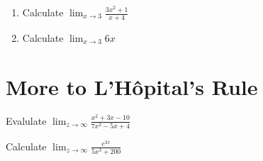 \documentclass[12pt]{article}
\newenvironment{problem}[2][Problem]{\begin{trivlist}
\item[\hskip \labelsep {\bfseries #1}\hskip \labelsep {\bfseries #2.}]}{\end{trivlist}}
\begin{document}
\renewcommand{\labelenumi}{(\alph{enumi})}
\begin{problem}4{}
\begin{enumerate}
    \item Calculate $\displaystyle{\lim_{x\to 3} \frac{3x^2+1}{x+4}}$
    \item Calculate  $\displaystyle{\lim_{x\to 3} 6x}$

 \end{enumerate}
 \end{problem}
 \pagebreak
 \section*{More to L'H\^opital's Rule}


\begin{problem}{1}
Evalulate $\displaystyle{\lim_{z\to \infty} \frac{x^2+3x-10}{7x^2-5x+4}}$
\end{problem}
\vspace{2in}
\begin{problem}{2}
Calculate
$\displaystyle{\lim_{z\to \infty} \frac{e^{3x}}{5x^3+200}}$
\end{problem}
 
\end{document}
